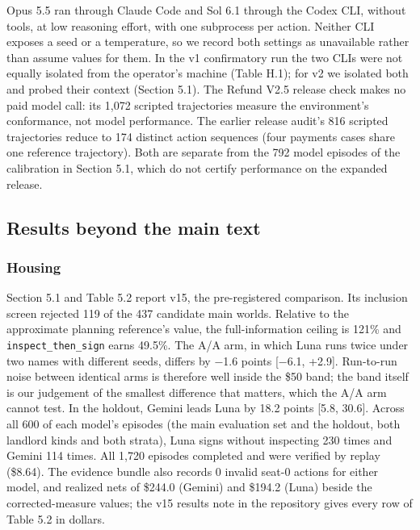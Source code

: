 Opus 5.5 ran through Claude Code and Sol 6.1 through the Codex CLI, without tools, at low reasoning
effort, with one subprocess per action. Neither CLI exposes a seed or a temperature, so we record both
settings as unavailable rather than assume values for them. In the v1 confirmatory run the two CLIs
were not equally isolated from the operator's machine (Table H.1); for v2 we isolated both and probed
their context (Section 5.1). The Refund V2.5 release check makes no paid model call: its 1,072 scripted
trajectories measure the environment's conformance, not model performance. The earlier release audit's 816 scripted
trajectories reduce to 174 distinct action sequences (four payments cases share one reference trajectory). Both are
separate from the 792 model episodes of the calibration in Section 5.1, which do not certify performance on the
expanded release.

\subsection{Results beyond the main text}\label{results-beyond-the-main-text}

\subsubsection{Housing}\label{housing}

Section 5.1 and Table 5.2 report v15, the pre-registered comparison. Its inclusion screen rejected 119 of the 437
candidate main worlds. Relative to the approximate planning reference's value, the full-information ceiling is 121\% and
\texttt{inspect\_\allowbreak{}then\_\allowbreak{}sign} earns 49.5\%. The A/A arm, in which Luna runs twice under two names with different seeds, differs by
−1.6 points {[}−6.1, +2.9{]}. Run-to-run noise between identical arms is therefore well inside the \$50 band; the band
itself is our judgement of the smallest difference that matters, which the A/A arm cannot test. In the holdout, Gemini
leads Luna by 18.2 points {[}5.8, 30.6{]}. Across all 600 of each model's episodes (the main evaluation set and the holdout, both
landlord kinds and both strata), Luna signs without inspecting 230 times and Gemini 114 times. All 1,720 episodes completed and were verified by
replay (\$8.64). The evidence bundle also records 0 invalid seat-0 actions for either model, and realized nets of
\$244.0 (Gemini) and \$194.2 (Luna) beside the corrected-measure values; the v15 results note in the repository gives
every row of Table 5.2 in dollars.

